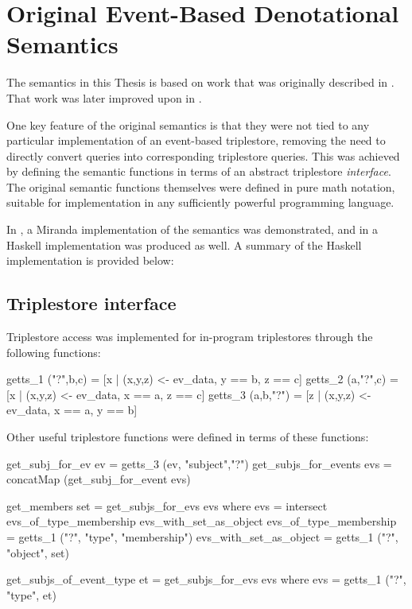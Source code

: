 \documentclass[../main.tex]{subfiles}
\begin{document}
\section{Original Event-Based Denotational Semantics}

The semantics in this Thesis is based on work that was originally described in \cite{frost2013event}.  That work was later improved upon in \cite{frostagboola2014}.

One key feature of the original semantics is that they were not tied to any particular implementation of an event-based triplestore,
removing the need to directly convert queries into corresponding triplestore queries.
This was achieved by defining the semantic functions in terms of an abstract triplestore {\em interface}.
The original semantic functions themselves were defined in pure math notation, suitable for implementation in any sufficiently powerful programming language.

In \cite{frostagboola2014}, a Miranda implementation of the semantics was demonstrated, and in \cite{frost2014denotational} a Haskell
implementation was produced as well.  A summary of the Haskell implementation is provided below:

\subsection{Triplestore interface}

Triplestore access was implemented for in-program triplestores through the following functions:

\begin{code}
	getts_1 ("?",b,c)   = [x | (x,y,z) <- ev_data, y == b, z == c]
	getts_2 (a,"?",c)   = [x | (x,y,z) <- ev_data, x == a, z == c]
	getts_3 (a,b,"?")   = [z | (x,y,z) <- ev_data, x == a, y == b]
\end{code}

Other useful triplestore functions were defined in terms of these functions:

\begin{code}
	get_subj_for_ev ev       = getts_3 (ev,  "subject","?")
	get_subjs_for_events evs = concatMap (get_subj_for_event evs)
	
	get_members set = get_subjs_for_evs evs
	where
		evs = intersect evs_of_type_membership evs_with_set_as_object
		evs_of_type_membership   = getts_1 ("?", "type", "membership")
		evs_with_set_as_object   = getts_1 ("?",  "object",  set)
		
	get_subjs_of_event_type et  = get_subjs_for_evs evs
	where
		evs = getts_1 ("?",  "type",  et)
\end{code}
\end{document}
